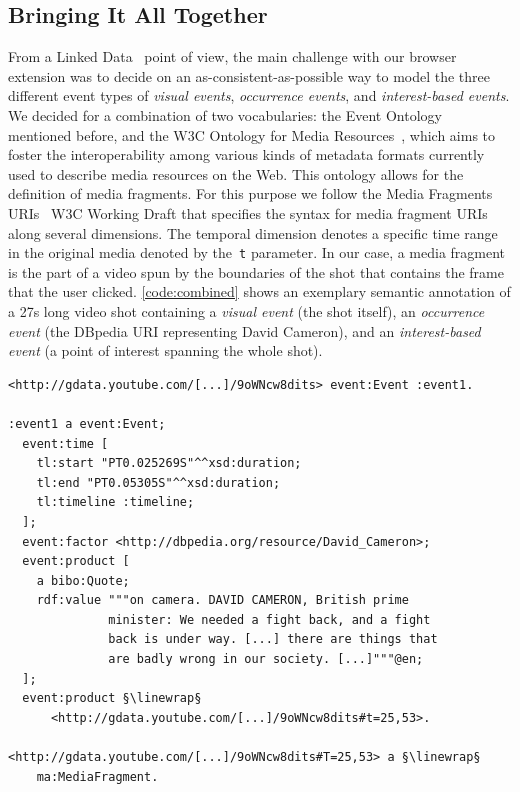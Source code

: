 \documentclass[runningheads,a4paper]{llncs}
\newcommand{\linewrap}{\raisebox{-.6ex}{\textcolor{grey}{$\hookleftarrow$}}}
\begin{document}
\subsection{Bringing It All Together}
From a Linked Data~\cite{Hausenblas:LDOW09} point of view, the main challenge with our browser extension was to decide on an as-consistent-as-possible way to model the three different event types of \emph{visual events}, \emph{occurrence events}, and \emph{interest-based events}. We decided for a combination of two vocabularies: the Event Ontology~\cite{Raimond:Event} mentioned before, and the W3C Ontology for Media Resources~\cite{mediaontology}, which aims to foster the interoperability among various kinds of metadata formats currently used to describe media resources on the Web. This ontology allows for the definition of media fragments. For this purpose we follow the Media Fragments URIs~\cite{W3C:MediaFrags} W3C Working Draft that specifies the syntax for media fragment URIs along several dimensions. The temporal dimension denotes a specific time range in the original media denoted by the~\texttt{t} parameter. In our case, a media fragment is the part of a video spun by the boundaries of the shot that contains the frame that the user clicked. \autoref{code:combined} shows an exemplary semantic annotation of a 27s long video shot containing a \emph{visual event} (the shot itself), an \emph{occurrence event} (the DBpedia URI representing David Cameron), and an \emph{interest-based event} (a point of interest spanning the whole shot). 

\begin{lstlisting}[caption=Semantic annotation of a 27s long video shot (\emph{visual event}) showing David Cameron (\emph{occurrence event}) talk about the London riots. The shot is also a point of interest generated by a click of a YouTube user (\emph{interest-based event})., label=code:combined, float=htb!, escapechar=§]
<http://gdata.youtube.com/[...]/9oWNcw8dits> event:Event :event1.

:event1 a event:Event;
  event:time [
    tl:start "PT0.025269S"^^xsd:duration;
    tl:end "PT0.05305S"^^xsd:duration;
    tl:timeline :timeline;
  ];
  event:factor <http://dbpedia.org/resource/David_Cameron>;
  event:product [
    a bibo:Quote;
    rdf:value """on camera. DAVID CAMERON, British prime
              minister: We needed a fight back, and a fight
              back is under way. [...] there are things that
              are badly wrong in our society. [...]"""@en;
  ];
  event:product §\linewrap§
      <http://gdata.youtube.com/[...]/9oWNcw8dits#t=25,53>.
      
<http://gdata.youtube.com/[...]/9oWNcw8dits#T=25,53> a §\linewrap§
    ma:MediaFragment.
\end{lstlisting} 
\end{document}
